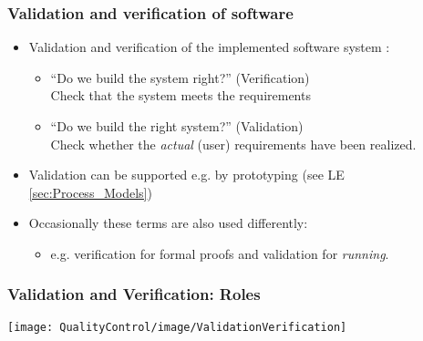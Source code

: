 \begin{frame}
\frametitle{Validation and verification of software}
\begin{itemize}
  \item Validation and verification of the implemented software system \citep{Boehm1984,FisherVV2007}:
    \begin{itemize}
      \item "`Do we build the system right?"' (Verification)\\
            Check  that the system meets the requirements
      \item "`Do we build the right system?"' (Validation)\\
            Check whether the \emph{actual} (user) requirements have been realized.
    \end{itemize}
  \item Validation can be supported e.g. by prototyping (see LE \ref{sec:Process_Models})
  \item Occasionally these terms are also used differently:
    \begin{itemize}
      \item e.g. verification for formal proofs and validation for \emph{running}.
    \end{itemize}
\end{itemize}
\end{frame}


\begin{frame}\frametitle{Validation and Verification: Roles}
\begin{center}
\texttt{[image: QualityControl/image/ValidationVerification]}
\end{center}
\end{frame}



